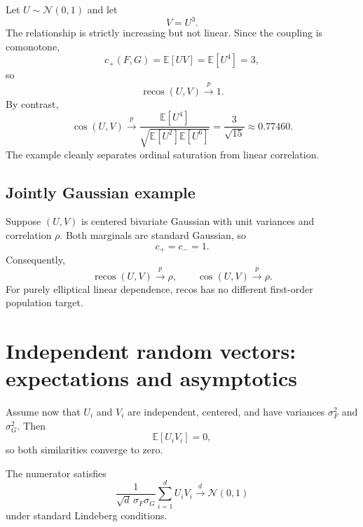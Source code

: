 \documentclass[11pt,a4paper]{article}
\newcommand{\E}{\mathbb{E}}
\newcommand{\recos}{\operatorname{recos}}
\newcommand{\cosim}{\operatorname{cos}}
\begin{document}
Let $U\sim\mathcal{N}(0,1)$ and let
\begin{equation}
    V=U^3.
\end{equation}
The relationship is strictly increasing but not linear. Since the coupling is comonotone,
\begin{equation}
    c_+(F,G)=\E[UV]=\E[U^4]=3,
\end{equation}
so
\begin{equation}
    \recos(U,V)\xrightarrow{p}1.
\end{equation}
By contrast,
\begin{equation}
    \cosim(U,V)
    \xrightarrow{p}
    \frac{\E[U^4]}
    {\sqrt{\E[U^2]\E[U^6]}}
    =\frac{3}{\sqrt{15}}
    \approx0.77460.
\end{equation}
The example cleanly separates ordinal saturation from linear correlation.

\subsection{Jointly Gaussian example}

Suppose $(U,V)$ is centered bivariate Gaussian with unit variances and correlation $\rho$. Both marginals are standard Gaussian, so
\begin{equation}
    c_+=c_-=1.
\end{equation}
Consequently,
\begin{equation}
    \recos(U,V)\xrightarrow{p}\rho,
    \qquad
    \cosim(U,V)\xrightarrow{p}\rho.
\end{equation}
For purely elliptical linear dependence, recos has no different first-order population target.

\section{Independent random vectors: expectations and asymptotics}

Assume now that $U_i$ and $V_i$ are independent, centered, and have variances $\sigma_F^2$ and $\sigma_G^2$. Then
\begin{equation}
    \E[U_iV_i]=0,
\end{equation}
so both similarities converge to zero.

The numerator satisfies
\begin{equation}
    \frac{1}{\sqrt{d}\,\sigma_F\sigma_G}
    \sum_{i=1}^d U_iV_i
    \xrightarrow{d}\mathcal{N}(0,1)
\end{equation}
under standard Lindeberg conditions.
\end{document}

